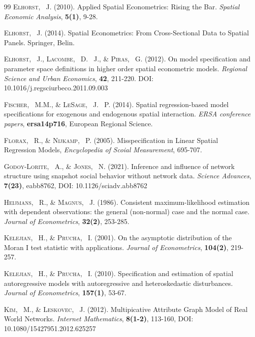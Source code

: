\documentclass[times, doublespace]{auth}
\begin{document}
\begin{thebibliography}{99}
\textsc{Elhorst, ~J.} (2010). Applied Spatial Econometrics: Rising the Bar. \textit{Spatial Economic Analysis}, \textbf{5(1)}, 9-28.

\textsc{Elhorst, ~J.} (2014). Spatial Econometrics: From Cross-Sectional Data to Spatial Panels. Springer, Belin.

\textsc{Elhorst, ~J., Lacombe, ~D. ~J., \& Piras, ~G.} (2012). On model specification and parameter space definitions in higher order spatial econometric models. \textit{Regional Science and Urban Economics}, \textbf{42}, 211-220. DOI: 10.1016/j.regsciurbeco.2011.09.003

\textsc{Fischer, ~M.M., \& LeSage, ~J. ~P.} (2014). Spatial regression-based model specifications for exogenous and endogenous spatial interaction. \textit{ERSA conference papers}, \textbf{ersa14p716}, European Regional Science.

\textsc{Florax, ~R., \& Nijkamp, ~P.} (2005). Misspecification in Linear Spatial Regression Models, \textit{Encyclopedia of Scoial Measurement}, 695-707.

\textsc{Godoy-Lorite, ~A., \& Jones, ~N.} (2021). Inference and influence of network structure using snapshot social behavior without network data. \textit{Science Advances}, \textbf{7(23)}, eabb8762, DOI: 10.1126/sciadv.abb8762

\textsc{Heijmans, ~R., \& Magnus, ~J.} (1986). Consistent maximum-likelihood estimation with dependent observations: the general (non-normal) case and the normal case. \textit{Journal of Econometrics}, \textbf{32(2)}, 253-285.

\textsc{Kelejian, ~H., \& Prucha, ~I.} (2001). On the asymptotic distribution of the Moran I test statistic with applications. \textit{Journal of Econometrics}, \textbf{104(2)}, 219-257.

\textsc{Kelejian, ~H., \& Prucha, ~I.} (2010). Specification and estimation of spatial autoregressive models with autoregressive and heteroskedastic disturbances. \textit{Journal of Econometrics}, \textbf{157(1)}, 53-67.

\textsc{Kim, ~M., \& Leskovec, ~J.} (2012). Multipicative Attribute Graph Model of Real World Networks. \textit{Internet Mathematics}, \textbf{8(1-2)}, 113-160, DOI: 10.1080/15427951.2012.625257


\end{thebibliography}
\end{document}

